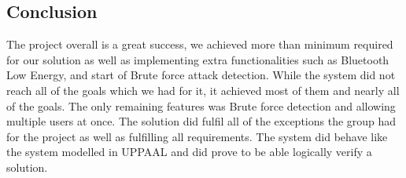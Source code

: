 \subsection{Conclusion}
The project overall is a great success, we achieved more than minimum required for our solution as well as implementing extra functionalities such as Bluetooth Low Energy, and start of Brute force attack detection. While the system did not reach all of the goals which we had for it, it achieved most of them and nearly all of the goals. The only remaining features was Brute force detection and allowing multiple users at once. The solution did fulfil all of the exceptions the group had for the project as well as fulfilling all requirements. The system did behave like the system modelled in UPPAAL and did prove to be able logically verify a solution.
